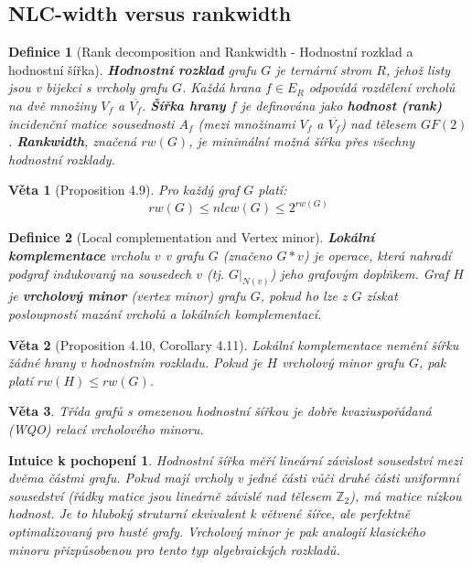 \documentclass[a4paper,11pt]{article}
\newtheorem{definition}{Definice}[section]
\newtheorem{theorem}{Věta}[section]
\newtheorem*{intuition}{Intuice k pochopení}
\begin{document}
\subsection{NLC-width versus rankwidth}

\begin{definition}[Rank decomposition and Rankwidth - Hodnostní rozklad a hodnostní šířka]
\textbf{Hodnostní rozklad} grafu $G$ je ternární strom $R$, jehož listy jsou v bijekci s vrcholy grafu $G$. Každá hrana $f \in E_R$ odpovídá rozdělení vrcholů na dvě množiny $V_f$ a $\overline{V_f}$.
\textbf{Šířka hrany} $f$ je definována jako \textbf{hodnost (rank)} incidenční matice sousednosti $A_f$ (mezi množinami $V_f$ a $\overline{V_f}$) nad tělesem $GF(2)$.
\textbf{Rankwidth}, značená $rw(G)$, je minimální možná šířka přes všechny hodnostní rozklady.
\end{definition}

\begin{theorem}[Proposition 4.9]
Pro každý graf $G$ platí:
$$rw(G) \le nlcw(G) \le 2^{rw(G)}$$
\end{theorem}

\begin{definition}[Local complementation and Vertex minor]
\textbf{Lokální komplementace} vrcholu $v$ v grafu $G$ (značeno $G * v$) je operace, která nahradí podgraf indukovaný na sousedech $v$ (tj. $G|_{N(v)}$) jeho grafovým doplňkem. 
Graf $H$ je \textbf{vrcholový minor} (vertex minor) grafu $G$, pokud ho lze z $G$ získat posloupností mazání vrcholů a lokálních komplementací.
\end{definition}

\begin{theorem}[Proposition 4.10, Corollary 4.11]
Lokální komplementace nemění šířku žádné hrany v hodnostním rozkladu. Pokud je $H$ vrcholový minor grafu $G$, pak platí $rw(H) \le rw(G)$.
\end{theorem}

\begin{theorem}
Třída grafů s omezenou hodnostní šířkou je dobře kvaziuspořádaná (WQO) relací vrcholového minoru.
\end{theorem}

\begin{intuition}
Hodnostní šířka měří lineární závislost sousedství mezi dvěma částmi grafu. Pokud mají vrcholy v jedné části vůči druhé části uniformní sousedství (řádky matice jsou lineárně závislé nad tělesem $\mathbb{Z}_2$), má matice nízkou hodnost. Je to hluboký struturní ekvivalent k větvené šířce, ale perfektně optimalizovaný pro husté grafy. Vrcholový minor je pak analogií klasického minoru přizpůsobenou pro tento typ algebraických rozkladů.
\end{intuition}
\end{document}
